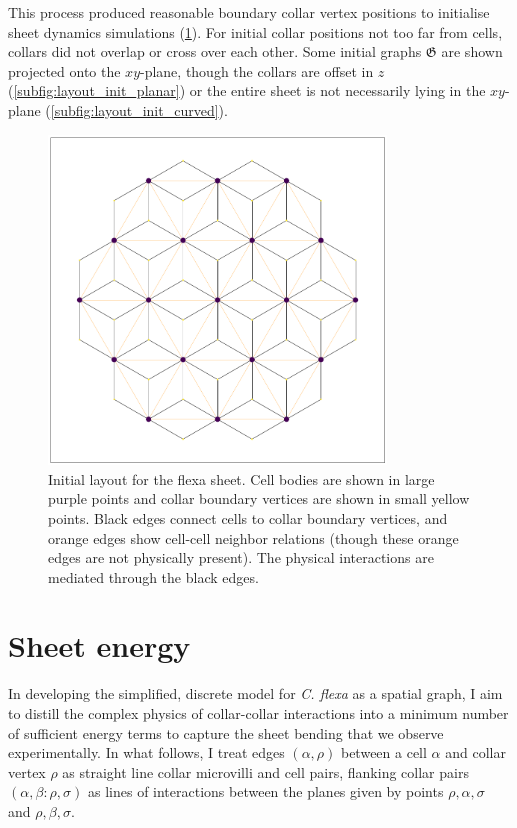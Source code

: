 This process produced reasonable boundary collar vertex positions to initialise sheet dynamics simulations (\cref{fig:layout_init}). For initial collar positions not too far from cells, collars did not overlap or cross over each other. Some initial graphs $\mathfrak{G}$ are shown projected onto the $xy$-plane, though the collars are offset in $z$ (\cref{subfig:layout_init_planar}) or the entire sheet is not necessarily lying in the $xy$-plane (\cref{subfig:layout_init_curved}).


\begin{figure}[hbtp]
    \centering
    \includegraphics[width=0.8\textwidth]{layout_init.png}
    \caption{Initial layout for the flexa sheet. Cell bodies are shown in large purple points and collar boundary vertices are shown in small yellow points. Black edges connect cells to collar boundary vertices, and orange edges show cell-cell neighbor relations (though these orange edges are not physically present). The physical interactions are mediated through the black edges.}
    \label{fig:layout_init}
\end{figure}

\section{Sheet energy}

In developing the simplified, discrete model for \textit{C. flexa} as a spatial graph, I aim to distill the complex physics of collar-collar interactions into a minimum number of sufficient energy terms to capture the sheet bending that we observe experimentally. In what follows, I treat edges $(\alpha, \rho)$ between a cell $\alpha$ and collar vertex $\rho$ as straight line collar microvilli and cell pairs, flanking collar pairs $(\alpha, \beta: \rho, \sigma)$ as lines of interactions between the planes given by points $\rho, \alpha, \sigma$ and $\rho, \beta, \sigma$. 

